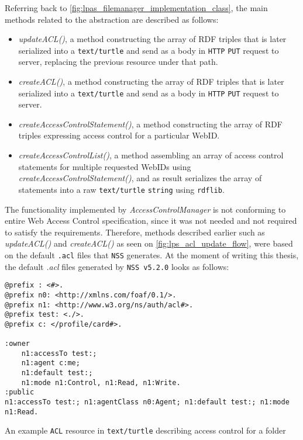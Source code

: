 Referring back to \autoref{fig:lpas_filemanager_implementation_class}, the main methods related to the abstraction are described as follows:
\begin{itemize}
	\item \textit{updateACL()}, a method constructing the array of RDF triples that is later serialized into a \texttt{text/turtle} and send as a body in \texttt{HTTP} \texttt{PUT} request to \solid{} server, replacing the previous resource under that path.
	\item \textit{createACL()}, a method constructing the array of RDF triples that is later serialized into a \texttt{text/turtle} and send as a body in \texttt{HTTP} \texttt{PUT} request to \solid{} server.
	\item \textit{createAccessControlStatement()}, a method constructing the array of RDF triples expressing access control for a particular WebID. 
	\item \textit{createAccessControlList()}, a method assembling an array of access control statements for multiple requested WebIDs using \textit{createAccessControlStatement()}, and as result serializes the array of statements into a raw \texttt{text/turtle} \texttt{string} using \texttt{rdflib}.
\end{itemize}

The functionality implemented by \textit{AccessControlManager} is not conforming to entire Web Access Control specification, since it was not needed and not required to satisfy the \lpa{} requirements. Therefore, methods described earlier such as \textit{updateACL()} and \textit{createACL()} as seen on \autoref{fig:lps_acl_update_flow}, were based on the default \texttt{.acl} files that \texttt{NSS} generates. At the moment of writing this thesis, the default \textit{.acl} files generated by \texttt{NSS v5.2.0} looks as follows:

\begin{listing}[H]    
\begin{verbatim}
@prefix : <#>.
@prefix n0: <http://xmlns.com/foaf/0.1/>.
@prefix n1: <http://www.w3.org/ns/auth/acl#>.
@prefix test: <./>.
@prefix c: </profile/card#>.
 
:owner
    n1:accessTo test:;
    n1:agent c:me;
    n1:default test:;
    n1:mode n1:Control, n1:Read, n1:Write.
:public
n1:accessTo test:; n1:agentClass n0:Agent; n1:default test:; n1:mode n1:Read.
\end{verbatim}
\caption{An example \texttt{ACL} resource in \texttt{text/turtle} describing access control for a folder} 
\label{lst:acl_file_example}
\end{listing}

